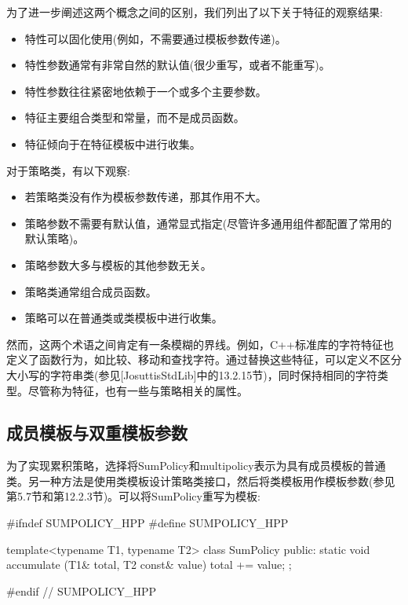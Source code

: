 为了进一步阐述这两个概念之间的区别，我们列出了以下关于特征的观察结果:

\begin{itemize}
\item 
特性可以固化使用(例如，不需要通过模板参数传递)。

\item 
特性参数通常有非常自然的默认值(很少重写，或者不能重写)。

\item 
特性参数往往紧密地依赖于一个或多个主要参数。

\item 
特征主要组合类型和常量，而不是成员函数。

\item 
特征倾向于在特征模板中进行收集。
\end{itemize}

对于策略类，有以下观察:

\begin{itemize}
\item 
若策略类没有作为模板参数传递，那其作用不大。

\item 
策略参数不需要有默认值，通常显式指定(尽管许多通用组件都配置了常用的默认策略)。

\item 
策略参数大多与模板的其他参数无关。

\item 
策略类通常组合成员函数。

\item 
策略可以在普通类或类模板中进行收集。
\end{itemize}

然而，这两个术语之间肯定有一条模糊的界线。例如，C++标准库的字符特征也定义了函数行为，如比较、移动和查找字符。通过替换这些特征，可以定义不区分大小写的字符串类(参见[JosuttisStdLib]中的13.2.15节)，同时保持相同的字符类型。尽管称为特征，也有一些与策略相关的属性。

\subsection{成员模板与双重模板参数}

为了实现累积策略，选择将SumPolicy和multipolicy表示为具有成员模板的普通类。另一种方法是使用类模板设计策略类接口，然后将类模板用作模板参数(参见第5.7节和第12.2.3节)。可以将SumPolicy重写为模板:

\begin{cpp}
#ifndef SUMPOLICY_HPP
#define SUMPOLICY_HPP

template<typename T1, typename T2>
class SumPolicy {
	public:
	static void accumulate (T1& total, T2 const& value) {
		total += value;
	}
};

#endif // SUMPOLICY_HPP
\end{cpp}

